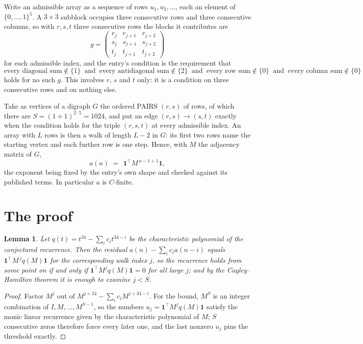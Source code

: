 \documentclass[11pt,a4paper]{article}
\theoremstyle{plain}
\newtheorem{lemma}[theorem]{Lemma}
\theoremstyle{definition}
\begin{document}
Write an admissible array as a sequence of rows $u_1,u_2,\dots$, each an element of
$\{0,\dots,1\}^{5}$. A $3\times3$ subblock occupies three consecutive rows and
three consecutive columns, so with $r,s,t$ three consecutive rows the blocks it
contributes are
\[
g=\begin{pmatrix}r_j&r_{j+1}&r_{j+2}\\ s_j&s_{j+1}&s_{j+2}\\ t_j&t_{j+1}&t_{j+2}\end{pmatrix}
\]
for each admissible index, and the entry's condition is the requirement that
\[
\text{every diagonal sum} \notin \{1\}\ \text{ and }\ \text{every antidiagonal sum} \notin \{2\}\ \text{ and }\ \text{every row sum} \notin \{0\}\ \text{ and }\ \text{every column sum} \notin \{0\}
\]
holds for no such $g$. This involves $r$, $s$ and $t$ only: it is a condition on
three consecutive rows and on nothing else.

Take as vertices of a digraph $G$ the ordered PAIRS $(r,s)$ of rows, of which there are
$S=(1+1)^{2\cdot5}=1024$, and put an edge $(r,s)\to(s,t)$ exactly when the condition
holds for the triple $(r,s,t)$ at every admissible index. An array with $L$ rows is then a
walk of length $L-2$ in $G$: its first two rows name the starting vertex and each further
row is one step. Hence, with $M$ the adjacency matrix of $G$,
\[
a(n)\;=\;\,\mathbf{1}^{\!\top}M^{\,n-1+1}\mathbf{1},
\]
the exponent being fixed by the entry's own shape and checked against its published terms.
In particular $a$ is $C$-finite.

\section{The proof}

\begin{lemma}\label{lem:crit}
Let $q(t)=t^{34}-\sum_i c_it^{34-i}$ be the characteristic polynomial of the
conjectured recurrence. Then the residual $a(n)-\sum_ic_ia(n-i)$ equals
$\mathbf{1}^{\!\top}M^{\,j}q(M)\mathbf{1}$ for the corresponding walk index
$j$, so the recurrence holds from some point on if and only if
$\mathbf{1}^{\!\top}M^{j}q(M)\mathbf{1}=0$ for all large $j$; and by the
Cayley--Hamilton theorem it is enough to examine $j<S$.
\end{lemma}

\begin{proof}
Factor $M^{j}$ out of $M^{j+34}-\sum_ic_iM^{j+34-i}$. For the bound, $M^{S}$
is an integer combination of $I,M,\dots,M^{S-1}$, so the numbers
$u_j=\mathbf{1}^{\!\top}M^{j}q(M)\mathbf{1}$ satisfy the monic linear recurrence given by
the characteristic polynomial of $M$; $S$ consecutive zeros therefore force every later one,
and the last nonzero $u_j$ pins the threshold exactly.
\end{proof}
\end{document}

